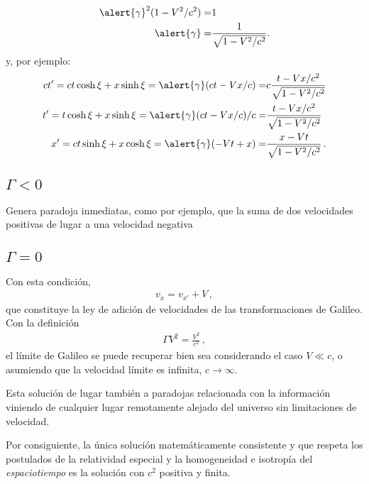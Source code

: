 \begin{frame}
\begin{align*}
\alert{\gamma}^2(1-V^2/c^2)=&1\nonumber\\
 \alert{\gamma}=&\frac{1}{\sqrt{1-V^2/c^2}}.
\end{align*}
y, por ejemplo:
\begin{align}
ct'=  ct\cosh{\xi}+x\sinh\xi=\alert{\gamma}(ct-V x/c)=&c\frac{t-V x/c^2}{\sqrt{1-V^2/c^2}}\nonumber\\
t'=  t\cosh{\xi}+x\sinh\xi=\alert{\gamma}(ct-V x/c)/c=&\frac{t-V x/c^2}{\sqrt{1-V^2/c^2}}\nonumber\\
x'=  ct\sinh{\xi}+x\cosh\xi=\alert{\gamma}(-Vt+ x)=&\frac{x-Vt}{\sqrt{1-V^2/c^2}}\,.
\end{align}

\end{frame}

\subsection{$\Gamma <0$}
Genera paradoja inmediatas, como por ejemplo, que la suma de dos
velocidades positivas de lugar a una velocidad negativa
\subsection{$\Gamma=0$}
Con esta condición,
\begin{align}
  v_x=v_{x'}+V\,,
\end{align}
que constituye la ley de adición de velocidades de las
transformaciones de Galileo. Con la definición
\begin{align*}
  \Gamma V^2=\frac{V^2}{c^2}\,,
\end{align*}
el límite de Galileo se puede recuperar bien sea considerando el caso
$V\ll c$, o asumiendo que la velocidad límite es infinita, $c\to
\infty$. 

Esta solución de lugar también a paradojas relacionada con la
información viniendo de cualquier lugar remotamente alejado del
universo sin limitaciones de velocidad. 


Por consiguiente, la única solución matemáticamente consistente y que
respeta los postulados de la relatividad especial y la homogeneidad e
isotropía del \emph{espaciotiempo} es la solución con $c^2$ positiva y
finita.

